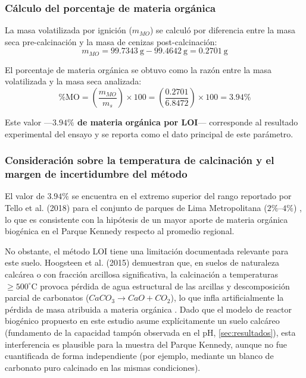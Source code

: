 \documentclass[fleqn]{jaes}
\begin{document}
\subsubsection{Cálculo del porcentaje de materia orgánica}

La masa volatilizada por ignición ($m_{MO}$) se calculó por diferencia entre la masa seca pre-calcinación y la masa de cenizas post-calcinación:
\begin{equation}
m_{MO} = 99.7343~\text{g} - 99.4642~\text{g} = 0.2701~\text{g}
\end{equation}

El porcentaje de materia orgánica se obtuvo como la razón entre la masa volatilizada y la masa seca analizada:
\begin{equation}
\%\text{MO} = \left(\frac{m_{MO}}{m_s}\right) \times 100 = \left(\frac{0.2701}{6.8472}\right) \times 100 = 3.94\%
\end{equation}

Este valor —\textbf{$3.94\%$ de materia orgánica por LOI}— corresponde al resultado experimental del ensayo y se reporta como el dato principal de este parámetro.

\subsubsection{Consideración sobre la temperatura de calcinación y el margen de incertidumbre del método}

El valor de $3.94\%$ se encuentra en el extremo superior del rango reportado por Tello et al. (2018) para el conjunto de parques de Lima Metropolitana ($2\%$--$4\%$) \cite{Tello2018}, lo que es consistente con la hipótesis de un mayor aporte de materia orgánica biogénica en el Parque Kennedy respecto al promedio regional.

No obstante, el método LOI tiene una limitación documentada relevante para este suelo. Hoogsteen et al. (2015) demuestran que, en suelos de naturaleza calcárea o con fracción arcillosa significativa, la calcinación a temperaturas $\geq 500^\circ\text{C}$ provoca pérdida de agua estructural de las arcillas y descomposición parcial de carbonatos ($CaCO_3 \rightarrow CaO + CO_2$), lo que infla artificialmente la pérdida de masa atribuida a materia orgánica \cite{Hoogsteen2015}. Dado que el modelo de reactor biogénico propuesto en este estudio asume explícitamente un suelo calcáreo (fundamento de la capacidad tampón observada en el pH, \cref{sec:resultados}), esta interferencia es plausible para la muestra del Parque Kennedy, aunque no fue cuantificada de forma independiente (por ejemplo, mediante un blanco de carbonato puro calcinado en las mismas condiciones).
\end{document}
